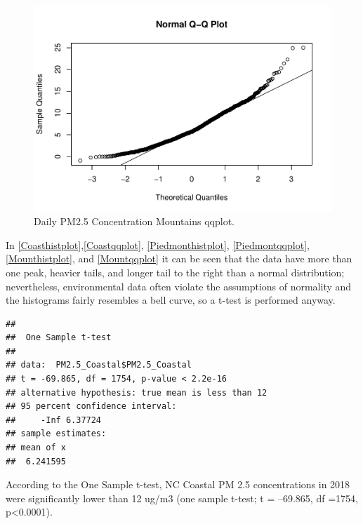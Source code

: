 \documentclass[12pt,]{article}
\newenvironment{Shaded}{\begin{snugshade}}{\end{snugshade}}
\newcommand{\KeywordTok}[1]{\textcolor[rgb]{0.13,0.29,0.53}{\textbf{#1}}}
\newcommand{\DataTypeTok}[1]{\textcolor[rgb]{0.13,0.29,0.53}{#1}}
\newcommand{\DecValTok}[1]{\textcolor[rgb]{0.00,0.00,0.81}{#1}}
\newcommand{\StringTok}[1]{\textcolor[rgb]{0.31,0.60,0.02}{#1}}
\newcommand{\OperatorTok}[1]{\textcolor[rgb]{0.81,0.36,0.00}{\textbf{#1}}}
\newcommand{\NormalTok}[1]{#1}
\begin{document}
\begin{figure}
\centering
\includegraphics{Raby_ENV872_Project_files/figure-latex/unnamed-chunk-47-1.pdf}
\caption{Daily PM2.5 Concentration Mountains qqplot.
\label{Mountqqplot}}
\end{figure}

In \autoref{Coasthistplot},\autoref{Coastqqplot},
\autoref{Piedmonthistplot}, \autoref{Piedmontqqplot},
\autoref{Mounthistplot}, and \autoref{Mountqqplot} it can be seen that
the data have more than one peak, heavier tails, and longer tail to the
right than a normal distribution; nevertheless, environmental data often
violate the assumptions of normality and the histograms fairly resembles
a bell curve, so a t-test is performed anyway.

\begin{Shaded}
\end{Shaded}

\begin{verbatim}
## 
##  One Sample t-test
## 
## data:  PM2.5_Coastal$PM2.5_Coastal
## t = -69.865, df = 1754, p-value < 2.2e-16
## alternative hypothesis: true mean is less than 12
## 95 percent confidence interval:
##     -Inf 6.37724
## sample estimates:
## mean of x 
##  6.241595
\end{verbatim}

According to the One Sample t-test, NC Coastal PM 2.5 concentrations in
2018 were significantly lower than 12 ug/m3 (one sample t-test; t =
--69.865, df =1754, p\textless{}0.0001).
\end{document}
